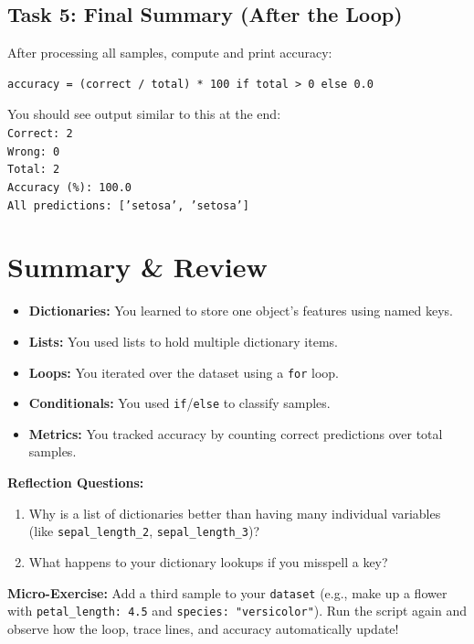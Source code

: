\subsection{Task 5: Final Summary (After the Loop)}
After processing all samples, compute and print accuracy:
\begin{verbatim}
accuracy = (correct / total) * 100 if total > 0 else 0.0
\end{verbatim}

\begin{tcolorbox}[title=Checkpoint]
You should see output similar to this at the end: \\
\texttt{Correct: 2} \\
\texttt{Wrong: 0} \\
\texttt{Total: 2} \\
\texttt{Accuracy (\%): 100.0} \\
\texttt{All predictions: ['setosa', 'setosa']}
\end{tcolorbox}

\section{Summary \& Review}
\begin{itemize}
    \item \textbf{Dictionaries:} You learned to store one object's features using named keys.
    \item \textbf{Lists:} You used lists to hold multiple dictionary items.
    \item \textbf{Loops:} You iterated over the dataset using a \texttt{for} loop.
    \item \textbf{Conditionals:} You used \texttt{if}/\texttt{else} to classify samples.
    \item \textbf{Metrics:} You tracked accuracy by counting correct predictions over total samples.
\end{itemize}

\textbf{Reflection Questions:}
\begin{enumerate}
    \item Why is a list of dictionaries better than having many individual variables (like \texttt{sepal\_length\_2}, \texttt{sepal\_length\_3})?
    \item What happens to your dictionary lookups if you misspell a key?
\end{enumerate}

\textbf{Micro-Exercise:} Add a third sample to your \texttt{dataset} (e.g., make up a flower with \texttt{petal\_length: 4.5} and \texttt{species: "versicolor"}). Run the script again and observe how the loop, trace lines, and accuracy automatically update!
